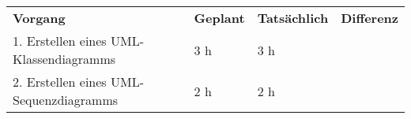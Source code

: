 \begin{tabularx}{\textwidth}{Xlll}
\rowcolor{heading}\textbf{Vorgang} & \textbf{Geplant} & \textbf{Tatsächlich} & \textbf{Differenz} \\
1. Erstellen eines \acs{UML}-Klassendiagramms & 3 h   & 3 h   &  \\
\rowcolor{odd}2. Erstellen eines \acs{UML}-Sequenzdiagramms & 2 h   & 2 h   &  \\
\end{tabularx}
